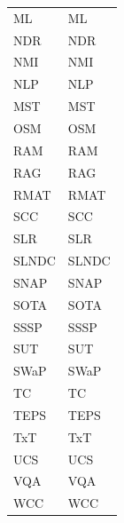 \begin{supertabular}{ll}
    \acs{ML}            &           \acl{ML}            \\
    \acs{NDR}           &           \acl{NDR}           \\
    \acs{NMI}           &           \acl{NMI}           \\
    \acs{NLP}           &           \acl{NLP}           \\
    \acs{MST}           &           \acl{MST}           \\
    \acs{OSM}           &           \acl{OSM}           \\
    \acs{RAM}           &           \acl{RAM}           \\
    \acs{RAG}           &           \acl{RAG}           \\
    \acs{RMAT}          &           \acl{RMAT}          \\
    \acs{SCC}           &           \acl{SCC}           \\
    \acs{SLR}           &           \acl{SLR}           \\
    \acs{SLNDC}         &           \acl{SLNDC}         \\
    \acs{SNAP}          &           \acl{SNAP}          \\
    \acs{SOTA}          &           \acl{SOTA}          \\
    \acs{SSSP}          &           \acl{SSSP}          \\
    \acs{SUT}           &           \acl{SUT}           \\
    \acs{SWaP}          &           \acl{SWaP}          \\
    \acs{TC}            &           \acl{TC}            \\
    \acs{TEPS}          &           \acl{TEPS}          \\
    \acs{TxT}           &           \acl{TxT}           \\
    \acs{UCS}           &           \acl{UCS}           \\
    \acs{VQA}           &           \acl{VQA}           \\
    \acs{WCC}           &           \acl{WCC}         \\  
\end{supertabular}